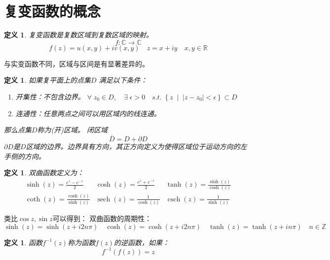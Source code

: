 \documentclass[10pt, a4paper, oneside]{ctexbook}
\newtheorem{definition}[theorem]{定义}
\begin{document}
\section{复变函数的概念}
\begin{definition}
    复变函数是复数区域到复数区域的映射。
    $$f:\mathbb{C}\to \mathbb{C}$$
    $$f(z)=u(x,y)+iv(x,y)\quad z=x+iy\quad x,y\in \mathbb{R}$$
\end{definition}
与实变函数不同，{\color{red}区域}与{\color{red}区间}是有显著差异的。
\begin{definition}
    如果复平面上的点集$D$ 满足以下条件：
    \begin{enumerate}
        \item 开集性：不包含边界。 $\forall \; z_0 \in D ,\quad \exists \; \epsilon >0 \quad s.t. \; \left\{ z\;\mid\;|z-z_0|<\epsilon \right\} \subset D $
        \item 连通性：任意两点之间可以用区域内的线连通。
    \end{enumerate}
    那么点集$D$称为(开)区域。
    闭区域$$\overline{D}=D+\partial D$$
    $\partial D$是$D$区域的边界。边界具有方向，其正方向定义为使得区域位于运动方向的左手侧的方向。
\end{definition}
\begin{definition}
    双曲函数定义为：
    $$
        \begin{array}{lll}
            \sinh (z)=\displaystyle\frac{e^{z}-e^{-z}}{2}                    & \cosh (z)=\displaystyle\frac{e^{z}+e^{-z}}{2}            & \tanh (z)=\displaystyle\frac{\sinh (z)}{\cosh (z)}       \\
            \operatorname{coth}(z)=\displaystyle \frac{\cosh (z)}{\sinh (z)} & \operatorname{sech}(z)=\displaystyle \frac{1}{\cosh (z)} & \operatorname{csch}(z)=\displaystyle \frac{1}{\sinh (z)}
        \end{array}
    $$
\end{definition}
类比$\cos z, \sin z$可以得到：
双曲函数的周期性：
$$
    \sinh (z) = \sinh (z+i2n\pi) \quad \cosh (z) = \cosh (z+i2n\pi) \quad \tanh(z)=\tanh(z+in\pi)\quad n\in\mathbb{Z}
$$
\begin{definition}
    函数$f^{-1}(z)$称为函数$f(z)$的逆函数，如果：
    $$
        f^{-1}(f(z))=z
    $$
\end{definition}
\end{document}
